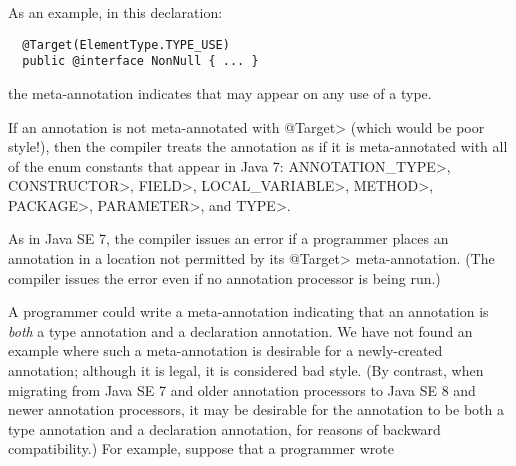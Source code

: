 \documentclass[10pt]{article}
\newcommand{\preverbnegspace}{\vspace{-5pt}}
\begin{document}
As an example, in this declaration:

\preverbnegspace
\begin{Verbatim}
  @Target(ElementType.TYPE_USE)
  public @interface NonNull { ... }
\end{Verbatim}

\noindent
the  meta-annotation indicates that
 may appear on any use of a type.

If an annotation is not meta-annotated with \<@Target> (which would be poor
style!), then the compiler treats the annotation as if it is
meta-annotated with all of the  enum constants
that appear in Java 7: \<ANNOTATION\_TYPE>, \<CONSTRUCTOR>, \<FIELD>,
\<LOCAL\_VARIABLE>, \<METHOD>, \<PACKAGE>, \<PARAMETER>, and \<TYPE>.

As in Java SE 7, the compiler issues an error if a programmer places an
annotation in a location not permitted by its \<@Target> meta-annotation.  (The
compiler issues the error even if no annotation processor is being run.)

A programmer could write a  meta-annotation indicating that an
annotation is \emph{both} a type annotation and a declaration annotation.
We have not found an example where such a meta-annotation is desirable for
a newly-created annotation; although it is legal, it is considered bad style.
(By contrast, when migrating from Java SE 7 and older annotation
processors to Java SE 8 and newer annotation processors, it may be
desirable for the annotation to be both a type annotation and a declaration
annotation, for reasons of backward compatibility.)
For example, suppose that a programmer wrote 
\end{document}
